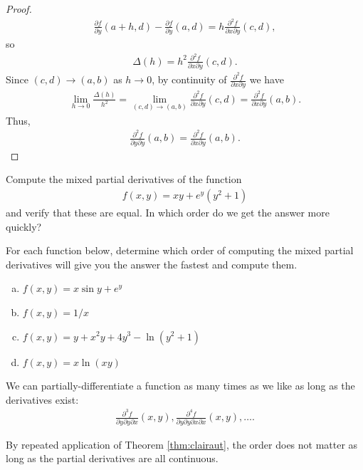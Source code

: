 \documentclass[12pt,letterpaper,reqno]{article}
\numberwithin{equation}{section}
\begin{document}
{\begin{proof}
\begin{align*}
		\frac{\partial f}{\partial y}(a+h,d)-\frac{\partial f}{\partial y}(a,d)=h\frac{\partial^2 f}{\partial x \partial y}(c,d),
	\end{align*}
	so 
	\begin{align*}
	\Delta(h)=h^2\frac{\partial^2 f}{\partial x \partial y}(c,d).
	\end{align*}
	Since $(c,d) \to (a,b)$ as $h \to 0$, by continuity of $\frac{\partial^2 f}{\partial x \partial y}$ we have
	\begin{align*}
		\lim_{h \to 0}\frac{\Delta(h)}{h^2}=\lim_{(c,d) \to (a,b)}\frac{\partial^2 f}{\partial x \partial y}(c,d)=\frac{\partial^2 f}{\partial x \partial y}(a,b).
	\end{align*}
	Thus,
	\begin{align*}
		\frac{\partial^2 f}{\partial y \partial y}(a,b)=\frac{\partial^2 f}{\partial x \partial y}(a,b).
	\end{align*}
\end{proof}

\begin{exercise}
Compute the mixed partial derivatives of the function
\begin{align*}
	f(x,y)=xy+e^y(y^2+1)
\end{align*}	
and verify that these are equal. In which order do we get the answer more quickly?
\end{exercise}

\begin{exercise}
For each function below, determine which order of computing the mixed partial derivatives will give you the answer the fastest and compute them.
\begin{enumerate}[(a)]
	\item $f(x,y)=x\sin y+e^y$
	\item $f(x,y)=1/x$
	\item $f(x,y)=y+x^2y+4y^3-\ln(y^2+1)$
	\item $f(x,y)=x\ln(xy)$
\end{enumerate}
\end{exercise}
We can partially-differentiate a function as many times as we like as long as the derivatives exist:
\begin{align*}
	\frac{\partial^3 f}{\partial y \partial y \partial x}(x,y), \frac{\partial^4 f}{\partial y \partial y \partial x \partial x}(x,y),\dots.
\end{align*}

By repeated application of Theorem \ref{thm:clairaut}, the order does not matter as long as the partial derivatives are all continuous.


}
\end{document}
